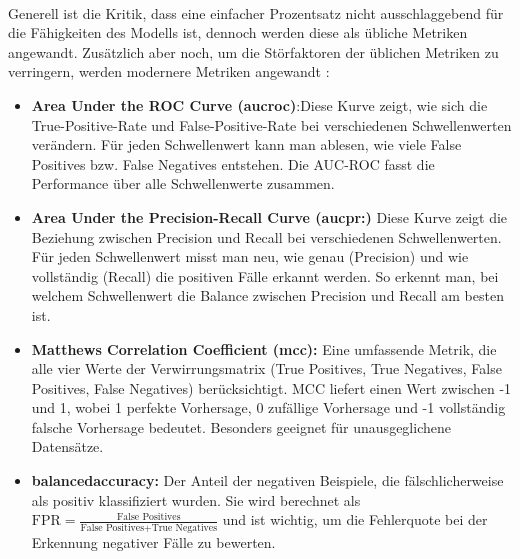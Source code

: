 \documentclass[a4paper,12pt]{article}
\begin{document}
	\\[0.5em]
	Generell ist die Kritik, dass eine einfacher Prozentsatz nicht ausschlaggebend für die Fähigkeiten des Modells ist, dennoch werden diese als übliche Metriken angewandt. Zusätzlich aber noch, um die Störfaktoren der üblichen Metriken zu verringern, werden modernere Metriken angewandt \cite{michelucci2022introduction}:
	
	\begin{itemize}
		\item \textbf{Area Under the ROC Curve (\gls{aucroc})}:Diese Kurve zeigt, wie sich die True-Positive-Rate und False-Positive-Rate bei verschiedenen Schwellenwerten verändern. Für jeden Schwellenwert kann man ablesen, wie viele False Positives bzw. False Negatives entstehen. Die AUC-ROC fasst die Performance über alle Schwellenwerte zusammen.
		\item \textbf{Area Under the Precision-Recall Curve (\gls{aucpr}:)} Diese Kurve zeigt die Beziehung zwischen Precision und Recall bei verschiedenen Schwellenwerten. Für jeden Schwellenwert misst man neu, wie genau (Precision) und wie vollständig (Recall) die positiven Fälle erkannt werden. So erkennt man, bei welchem Schwellenwert die Balance zwischen Precision und Recall am besten ist.
		\item \textbf{Matthews Correlation Coefficient (\gls{mcc}):} Eine umfassende Metrik, die alle vier Werte der Verwirrungsmatrix (True Positives, True Negatives, False Positives, False Negatives) berücksichtigt. MCC liefert einen Wert zwischen -1 und 1, wobei 1 perfekte Vorhersage, 0 zufällige Vorhersage und -1 vollständig falsche Vorhersage bedeutet. Besonders geeignet für unausgeglichene Datensätze.
		\item \textbf{\gls{balancedaccuracy}:} Der Anteil der negativen Beispiele, die fälschlicherweise als positiv klassifiziert wurden. Sie wird berechnet als \(\text{FPR} = \frac{\text{False Positives}}{\text{False Positives} + \text{True Negatives}}\) und ist wichtig, um die Fehlerquote bei der Erkennung negativer Fälle zu bewerten.
	\end{itemize}
	
\end{document}
